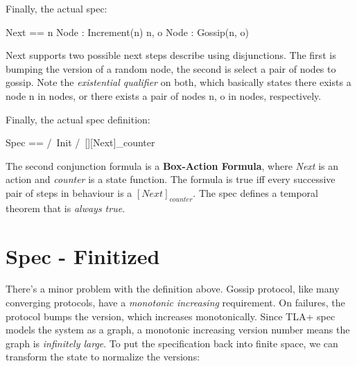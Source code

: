 \documentclass{report}
\begin{document}
Finally, the actual spec: 
\begin{tla}
    Next == \/ \E n \in Node : Increment(n)
            \/ \E n, o \in Node : Gossip(n, o)
\end{tla}
\begin{tlatex}
%
\end{tlatex}

Next supports two possible next steps describe using disjunctions. The first is
bumping the version of a random node, the second is select a pair of nodes to
gossip. Note the \textit{existential qualifier} on both, which basically states
there exists a node n in nodes, or there exists a pair of nodes n, o in nodes,
respectively.\newline

Finally, the actual spec definition:
\begin{tla}
    Spec == /\ Init
            /\ [][Next]_counter  
\end{tla}
\begin{tlatex}
%
%
\end{tlatex}

The second conjunction formula is a \textbf{Box-Action Formula}, where
\textit{Next} is an action and \textit{counter} is a state function. The formula
is true iff every successive pair of steps in behaviour is a $[Next]_{counter}$.
The spec defines a temporal theorem that is \textit{always true}. 

\section{Spec - Finitized}

There's a minor problem with the definition above. Gossip protocol, like many
converging protocols, have a \textit{monotonic increasing} requirement. On
failures, the protocol bumps the version, which increases monotonically. Since
TLA+ spec models the system as a graph, a monotonic increasing version number
means the graph is \textit{infinitely large}. To put the specification back into
finite space, we can transform the state to normalize the versions:\newline
\end{document}

